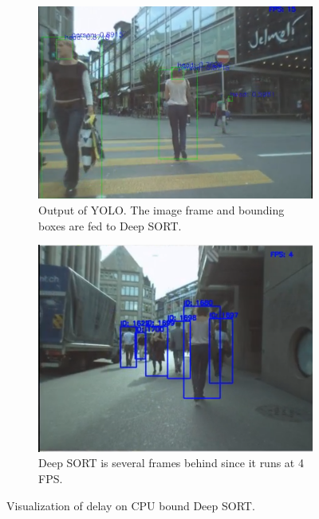\begin{figure}[ht]
    \begin{subfigure}[b]{.45\textwidth}
        \centering
        \includegraphics[width=1.0\linewidth]{img/chapter5_implementation/deepSortCPU.png}
        \caption{Output of YOLO. The image frame and bounding boxes are fed to Deep SORT.}
    \end{subfigure}%
    \hspace{\fill} 
    \begin{subfigure}[b]{.45\textwidth}
        \centering
        \includegraphics[width=0.935\linewidth]{img/chapter5_implementation/deepSortCPU1.png}
        \caption{Deep SORT is several frames behind since it runs at 4 FPS.}
    \end{subfigure}
    \vspace{-1\baselineskip}
    \begin{center}
        \caption{Visualization of delay on CPU bound Deep SORT.}
        \label{fig:deepSortCPU}
    \end{center}
\end{figure}


